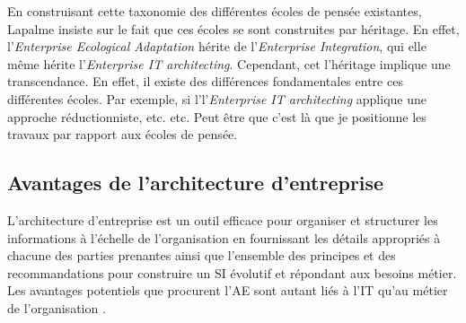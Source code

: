 %
%
%
%

En construisant cette taxonomie des différentes écoles de pensée existantes, 
Lapalme insiste sur le fait que ces écoles se sont construites par héritage. En 
effet, l'\textit{Enterprise Ecological Adaptation} hérite de 
l'\textit{Enterprise Integration}, qui elle même hérite l'\textit{Enterprise IT 
architecting}. Cependant, cet l'héritage implique une transcendance. En effet, 
il existe des différences fondamentales entre ces différentes écoles. Par 
exemple, si l'l'\textit{Enterprise IT architecting} applique une approche 
réductionniste, etc. etc.
Peut être que c'est là que je positionne les travaux par rapport aux écoles de pensée.




  
	\subsection{Avantages de l'architecture d'entreprise}
L'architecture d'entreprise est un outil efficace pour organiser et structurer les informations à l'échelle de l'organisation en fournissant les détails appropriés à chacune des 
parties prenantes ainsi que l'ensemble des principes et des recommandations pour 
construire un SI évolutif et répondant aux besoins métier. Les avantages 
potentiels que procurent l'AE sont autant liés à l'IT qu'au métier de 
l'organisation \cite{ross2005understanding}.


